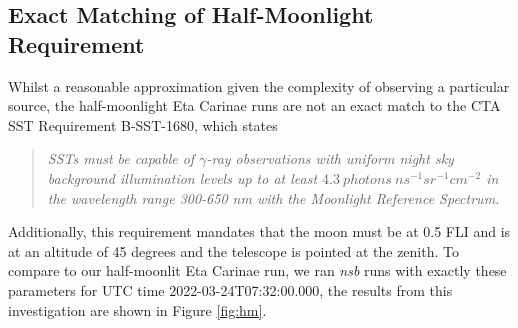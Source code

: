 \subsection{Exact Matching of Half-Moonlight Requirement}
Whilst a reasonable approximation given the complexity of observing a particular source, the half-moonlight Eta Carinae runs are not an exact match to the CTA SST Requirement B-SST-1680, which states
\begin{quote}
    \textit{SSTs must be capable of $\gamma$-ray observations with uniform night sky background illumination levels up to at least $4.3\ photons\ ns^{-1} sr^{-1} cm^{-2}$ in the wavelength range 300-650 nm with the Moonlight Reference Spectrum.}
\end{quote}
Additionally, this requirement mandates that the moon must be at 0.5 FLI and is at an altitude of 45 degrees and the telescope is pointed at the zenith. To compare to our half-moonlit Eta Carinae run, we ran \textit{nsb} runs with exactly these parameters for UTC time 2022-03-24T07:32:00.000, the results from this investigation are shown in Figure \ref{fig:hm}.

